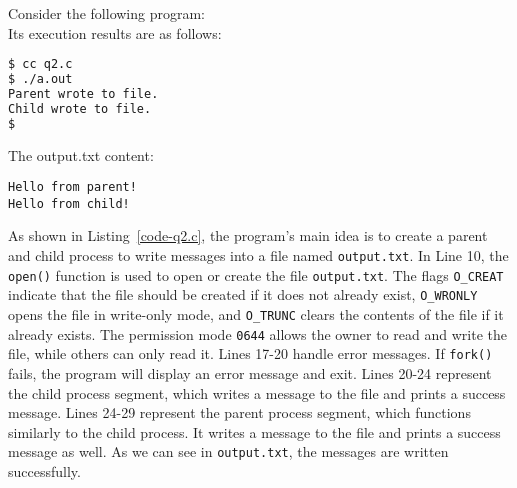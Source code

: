 \documentclass[10pt, answers]{exam}
\begin{document}
\begin{questions}
\begin{solution}

Consider the following program:\\



Its execution results are as follows:

\begin{lstlisting}[language=bash]
$ cc q2.c
$ ./a.out 
Parent wrote to file.
Child wrote to file.
$
\end{lstlisting}

The output.txt content:

\begin{lstlisting}
Hello from parent!
Hello from child!
\end{lstlisting}


As shown in Listing~\ref{code-q2.c}, the program's main idea is to create a parent and child process to write messages into a file named \texttt{output.txt}.
In Line 10, the \texttt{open()} function is used to open or create the file \texttt{output.txt}. The flags \texttt{O\_CREAT} indicate that the file should be created if it does not already exist, \texttt{O\_WRONLY} opens the file in write-only mode, and \texttt{O\_TRUNC} clears the contents of the file if it already exists. The permission mode \texttt{0644} allows the owner to read and write the file, while others can only read it.
Lines 17-20 handle error messages. If \texttt{fork()} fails, the program will display an error message and exit.
Lines 20-24 represent the child process segment, which writes a message to the file and prints a success message.
Lines 24-29 represent the parent process segment, which functions similarly to the child process. It writes a message to the file and prints a success message as well.
As we can see in \texttt{output.txt}, the messages are written successfully.


\end{solution}

\\
\begin{solution}




\end{solution}
\end{questions}
\end{document}
